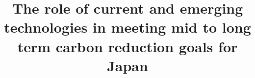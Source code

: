 \documentclass[review]{elsarticle}
\begin{document}
\begin{frontmatter}
\title{The role of current and emerging technologies in meeting mid to long term carbon reduction goals for Japan}

\date{}                     %




	
\begin{keyword}

\end{keyword}



\end{frontmatter}
\glsresetall

\linenumbers



\FloatBarrier

\FloatBarrier

\FloatBarrier

\FloatBarrier

\FloatBarrier

\FloatBarrier

\FloatBarrier


\newpage
\appendix

\end{document}
